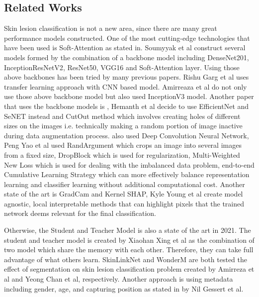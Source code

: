 \documentclass[sensors,article,submit,pdftex,moreauthors]{Definitions/mdpi}
\begin{document}
\subsection{Related Works}
Skin lesion classification is not a new area, since there are many great performance models constructed. One of the most cutting-edge technologies that have been used is Soft-Attention as stated in\cite{03358}. Soumyyak et al construct several models formed by the combination of a backbone model including DenseNet201\cite{06993}, InceptionResNetV2\cite{00567}, ResNet50\cite{03385}\cite{05027}, VGG16\cite{1556} and Soft-Attention layer. Using those above backbones has been tried by many previous papers. Rishu Garg et al \cite{03798} uses transfer learning approach with CNN based model. Amirreaza et al \cite{10348} do not only use those above backbone model but also used InceptionV3\cite{00567} model. Another paper that uses the backbone models is \cite{09418}, Hemanth et al decide to use EfficientNet\cite{11946} and SeNET\cite{01507} instead and CutOut\cite{04552v2} method which involves creating holes of different sizes on the images i.e. technically making a random portion of image inactive during data augmentation process. \cite{01284} also used Deep Convolution Neural Network, Peng Yao et al used RandArgument which crops an image into several images from a fixed size, DropBlock which is used for regularization, Multi-Weighted New Loss which is used for dealing with the imbalanced data problem, end-to-end Cumulative Learning Strategy which can more effectively balance representation learning and classifier learning without additional computational cost. Another state of the art is GradCam and Kernel SHAP\cite{06612}, Kyle Young et al create model agnostic, local interpretable methods that can highlight pixels that the trained network deems relevant for the final classification.

Otherwise, the Student and Teacher Model is also a state of the art in 2021\cite{03225}. The student and teacher model is created by Xiaohan Xing et al as the combination of two model which share the memory with each other. Therefore, they can take full advantage of what others learn. SkinLinkNet\cite{12602} and WonderM\cite{03426} are both tested the effect of segmentation on skin lesion classification problem created by Amirreza et al and Yeong Chan et al, respectively. Another approach is using metadata including gender, age, and capturing position as stated in \cite{03910} by Nil Gessert et al. 
\end{document}
